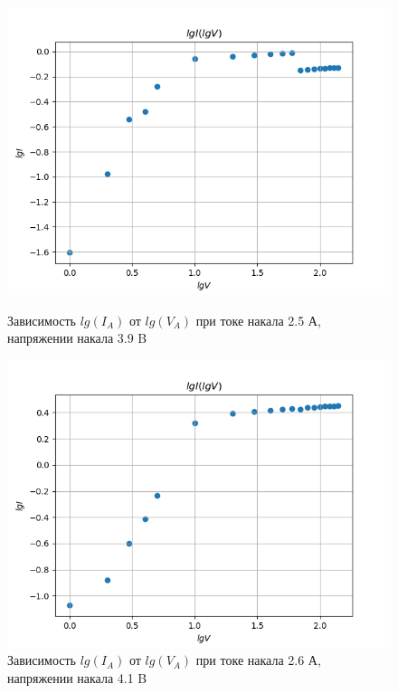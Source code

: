 \documentclass[a4paper]{article}
\begin{document}
\begin{figure}[h]
\begin{center}
\begin{minipage}[h]{0.45\linewidth}
\includegraphics[width=1\linewidth]{./Diode/graph_3.png}
\caption{Зависимость $lg(I_A)$ от $lg(V_A)$ при токе накала 2.5 А, напряжении накала 3.9 B} %
\end{minipage}
\hfill 
\begin{minipage}[h]{0.45\linewidth}
\includegraphics[width=1\linewidth]{./Diode/graph_4.png}
\caption{Зависимость $lg(I_A)$ от $lg(V_A)$ при токе накала 2.6 А, напряжении накала 4.1 B }
\label{ris:experimcoded}
\end{minipage}
\end{center}
\end{figure}
\end{document}
